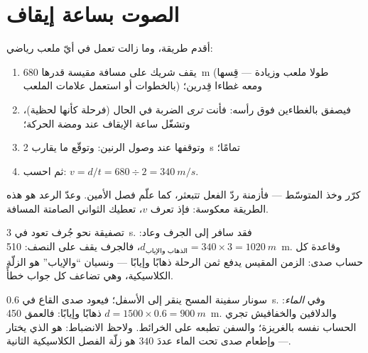 \section{الصوت بساعة إيقاف}

\begin{method}\label{met:g7:sound-production:measure}
أقدم طريقة، وما زالت تعمل في أيّ ملعب رياضي:
\begin{enumerate}
  \item يقف شريك على مسافة مقيسة قدرها \qty{680}{m} (طولا
        ملعب وزيادة --- قِسها بالخطوات أو استعمل علامات
        الملعب) ومعه غطاءا قِدرين؛
  \item فيصفق بالغطاءين فوق رأسه: فأنت \emph{ترى} الضربة في
        الحال (فرحلة  كأنها لحظية)، وتشغّل ساعة الإيقاف
        عند ومضة الحركة؛
  \item وتوقفها عند وصول الرنين: وتوقّع ما يقارب \qty{2}{s}
        تمامًا؛
  \item ثم احسب: $v = d/t = 680 \div 2 = \qty{340}{m/s}$.
\end{enumerate}
كرّر وخذ المتوسّط --- فأزمنة ردّ الفعل تتبعثر، كما علّم فصل
 الأمين. وعدّ الرعد هو هذه الطريقة معكوسة: فإذ تعرف $v$،
تعطيك الثواني الصامتة المسافة.
\end{method}

\begin{example}\label{ex:g7:sound-production:echo}
تصفيقة نحو جُرف تعود في \qty{3}{s}. فقد سافر  إلى الجرف
وعاد: $d_{\text{الذهاب والإياب}} = 340 \times 3 = \qty{1020}{m}$،
فالجرف يقف على النصف: \qty{510}{m}. وقاعدة كل حساب صدى: الزمن
المقيس يدفع ثمن الرحلة ذهابًا وإيابًا --- ونسيان ``والإياب'' هو
الزلّة الكلاسيكية، وهي تضاعف كل جواب خطأً.
\end{example}

\begin{example}\label{ex:g7:sound-production:sonar}
سونار سفينة المسح ينقر إلى الأسفل؛ فيعود صدى القاع في
\qty{0.6}{s}. وفي \emph{الماء}: $d = 1500 \times 0.6 =
\qty{900}{m}$ ذهابًا وإيابًا: فالعمق \qty{450}{m}. والدلافين
والخفافيش تجري الحساب نفسه بالغريزة؛ والسفن تطبعه على الخرائط.
ولاحظ الانضباط:  هو الذي يختار  --- وإطعام صدى تحت
الماء عددَ  $340$ هو زلّة الفصل الكلاسيكية الثانية.
\end{example}

